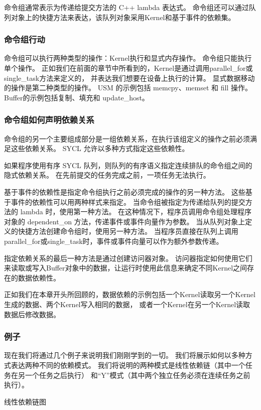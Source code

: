 命令组通常表示为传递给提交方法的 C++ lambda 表达式。 
命令组还可以通过队列对象上的快捷方法来表达，该队列对象采用Kernel和基于事件的依赖集。

\subsubsection{命令组行动}
命令组可以执行两种类型的操作：Kernel执行和显式内存操作。 命令组只能执行单个操作。 
正如我们在前面的章节中所看到的，Kernel是通过调用parallel\_for或single\_task方法来定义的，
并表达我们想要在设备上执行的计算。 显式数据移动的操作是第二种类型的操作。 
USM 的示例包括 memcpy、memset 和 fill 操作。 Buffer的示例包括复制、填充和 update\_host。

\subsubsection{命令组如何声明依赖关系}
命令组的另一个主要组成部分是一组依赖关系，在执行该组定义的操作之前必须满足这些依赖关系。 
SYCL 允许以多种方式指定这些依赖性。

如果程序使用有序 SYCL 队列，则队列的有序语义指定连续排队的命令组之间的隐式依赖关系。 
在先前提交的任务完成之前，一项任务无法执行。

基于事件的依赖性是指定命令组执行之前必须完成的操作的另一种方法。 这些基于事件的依赖性可以用两种样式来指定。 
当命令组被指定为传递给队列的提交方法的 lambda 时，使用第一种方法。 
在这种情况下，程序员调用命令组处理程序对象的 dependent\_on 方法，传递事件或事件向量作为参数。 
当从队列对象上定义的快捷方法创建命令组时，使用另一种方法。 
当程序员直接在队列上调用parallel\_for或single\_task时，事件或事件向量可以作为额外参数传递。

指定依赖关系的最后一种方法是通过创建访问器对象。 
访问器指定如何使用它们来读取或写入Buffer对象中的数据，让运行时使用此信息来确定不同Kernel之间存在的数据依赖性。

正如我们在本章开头所回顾的，数据依赖的示例包括一个Kernel读取另一个Kernel生成的数据、两个Kernel写入相同的数据，
或者一个Kernel在另一个Kernel读取数据后修改数据。

\subsubsection{例子}
现在我们将通过几个例子来说明我们刚刚学到的一切。 我们将展示如何以多种方式表达两种不同的依赖模式。 
我们将说明的两种模式是线性依赖链（其中一个任务在另一个任务之后执行）
和“Y”模式（其中两个独立任务必须在连续任务之前执行）。

{\color{red} 线性依赖链图}

